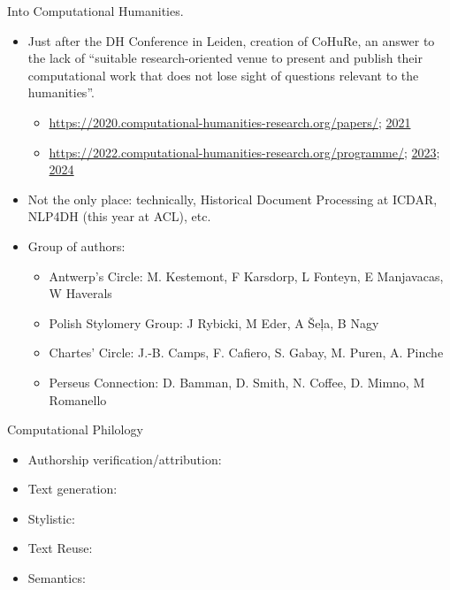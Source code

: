 \documentclass[aspectratio=169]{beamer}
\begin{document}
\begin{frame}{Into Computational Humanities.}
    \begin{itemize}
        \item Just after the DH Conference in Leiden, creation of CoHuRe, an answer to the lack of ``suitable research-oriented venue to present and publish their computational work that does not lose sight of questions relevant to the humanities''. 
        \begin{itemize}
            \item \url{https://2020.computational-humanities-research.org/papers/}; \href{https://2020.computational-humanities-research.org/papers/}{2021}
            \item \url{https://2022.computational-humanities-research.org/programme/};
            \href{https://2023.computational-humanities-research.org/programme/}{2023};
            \href{https://2024.computational-humanities-research.org/programme/}{2024}
        \end{itemize}
        \item Not the only place: technically, Historical Document Processing at ICDAR, NLP4DH (this year at ACL), etc.
        \item Group of authors:
        \begin{itemize}
            \item Antwerp's Circle: M. Kestemont, F Karsdorp, L Fonteyn, E Manjavacas, W Haverals
            \item Polish Stylomery Group: J Rybicki, M Eder, A Šeļa, B Nagy
            \item Chartes' Circle: J.-B. Camps, F. Cafiero, S. Gabay, M. Puren, A. Pinche
            \item Perseus Connection: D. Bamman, D. Smith, N. Coffee, D. Mimno, M Romanello
        \end{itemize}
    \end{itemize}
\end{frame}

\begin{frame}{Computational Philology}
    \footnotesize
    \begin{itemize}
        \item Authorship verification/attribution: 
        \item Text generation: 
        \item Stylistic: 
        \item Text Reuse: 
        \item Semantics: 
    \end{itemize}
\end{frame}
\end{document}
